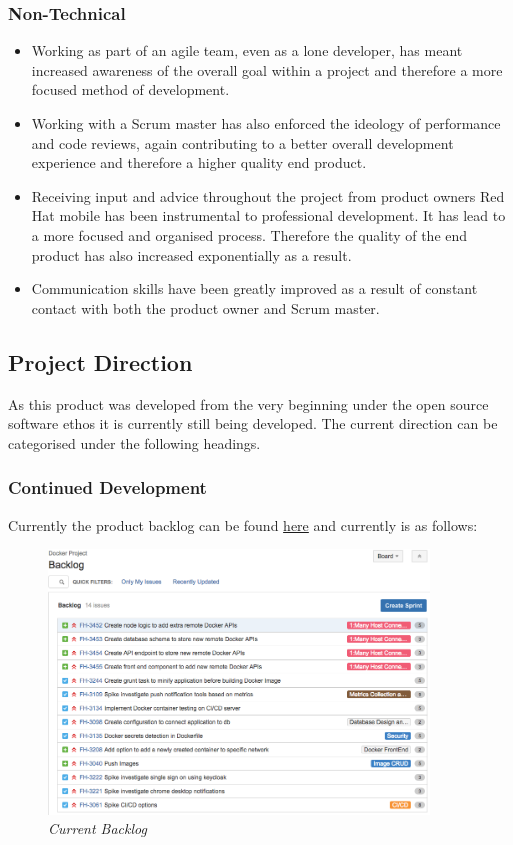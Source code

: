 \subsubsection{Non-Technical}
\begin{itemize}
	\item Working as part of an agile team, even as a lone developer, has meant increased awareness of the overall goal within a project and therefore a more focused method of development.
	\item Working with a \gls{Scrum} master has also enforced the ideology of performance and code reviews, again contributing to a better overall development experience and therefore a higher quality end product.
	\item Receiving input and advice throughout the project from product owners Red Hat mobile has been instrumental to professional development. It has lead to a more focused and organised process. Therefore the quality of the end product has also increased exponentially as a result.
	\item Communication skills have been greatly improved as a result of constant contact with both the product owner and \gls{Scrum} master.
\end{itemize}

\newpage
\subsection{Project Direction}
As this product was developed from the very beginning under the open source software ethos it is currently still being developed. The current direction can be categorised under the following headings.

\subsubsection{Continued Development}
\label{subs:cont_dev}
Currently the product backlog can be found \href{https://issues.jboss.org/secure/RapidBoard.jspa?rapidView=3836&view=planning}{here} and currently is as follows:

\begin{figure}[!ht]
	\centering
	\includegraphics*[width=0.9\textwidth]{images/final_backlog}
	\caption{\em Current Backlog}
	\label{fig:final_backlog}
\end{figure}


